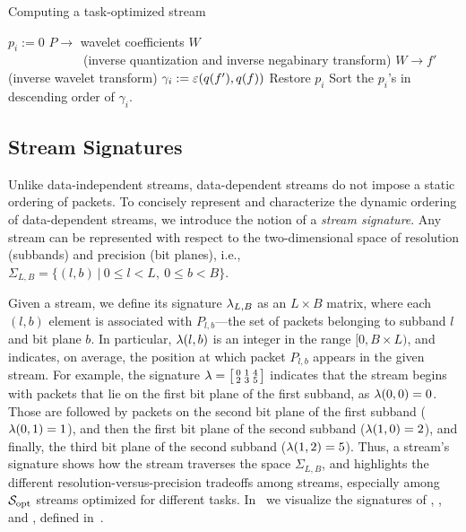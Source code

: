 \begin{algorithm}[h]
  \caption{Computing a task-optimized stream}
  \begin{algorithmic}[1]
			\State $p_i := 0$
      \State $P \rightarrow$ wavelet coefficients $W$ \\
      		\ \ \ \ \ \ \ \ \ \ \ \ (inverse quantization and inverse negabinary transform)
			\State $W \rightarrow f'$ (inverse wavelet transform)
			\State $\gamma_i := \err(q(f'),q(f))$			
			\State Restore $p_i$
		\EndFor
		\State Sort the $p_i$'s in descending order of $\gamma_i$.
	\end{algorithmic}
	\label{alg:greedy}
\end{algorithm}

\subsection{Stream Signatures} \label{sec:stream-signature}
Unlike data-independent streams, data-dependent streams do not impose a static ordering of packets.
To concisely represent and characterize the dynamic ordering of data-dependent streams, we introduce
the notion of a \emph{stream signature}. Any stream can be represented with respect to the
two-dimensional space of resolution (subbands) and precision (bit planes), i.e., \mbox{$
\Sigma_{L,B}=\{(l,b)\ |\ 0\leq l < L,\ 0\leq b < B\}$.}

Given a stream, we define its signature $\sgn_{L,B}$ as an $L \times B$ matrix, where each $(l,b)$
element is associated with $P_{l,b}$---the set of packets belonging to subband $l$ and bit plane
$b$. In particular, $\sgn(l,b)$ is an integer in the range $[0, B\times L)$, and indicates, on
average, the position at which packet $P_{l,b}$ appears in the given stream. For example, the
signature $\sgn=\bigl[ \begin{smallmatrix}0 & 1 & 4\\ 2 & 3 & 5\end{smallmatrix}\bigr]$ indicates
that the stream begins with packets that lie on the first bit plane of the first subband, as
$\sgn(0,0)=0$. Those are followed by packets on the second bit plane of the first subband
($\sgn(0,1)=1$), and then the first bit plane of the second subband ($\sgn(1,0)=2$), and finally,
the third bit plane of the second subband ($\sgn(1,2)=5$). Thus, a stream's signature shows how the
stream traverses the space $\Sigma_{L,B}$, and highlights the different resolution-versus-precision
tradeoffs among streams, especially among $\sopt$ streams optimized for different tasks.
In~ we visualize the signatures of \sbit, \slvl, and \swav, defined
in~.

